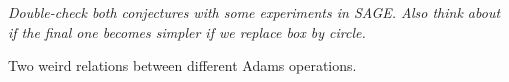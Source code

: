 \emph{Double-check both conjectures with some experiments in SAGE. Also think about if the final one becomes simpler if we replace box by circle. }


\begin{proposition}
Two weird relations between different Adams operations.
\end{proposition}


